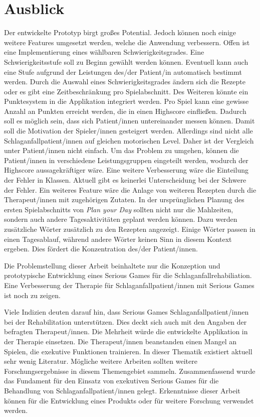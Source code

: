 \section{Ausblick}
Der entwickelte Prototyp birgt großes Potential. Jedoch können noch einige weitere Features umgesetzt werden, welche die Anwendung verbessern. Offen ist eine Implementierung eines wählbaren Schwierigkeitsgrades. Eine Schwierigkeitsstufe soll zu Beginn gewählt werden können. Eventuell kann auch eine Stufe aufgrund der Leistungen des/der Patient/in automatisch bestimmt werden. Durch die Auswahl eines Schwierigkeitsgrades ändern sich die Rezepte oder es gibt eine Zeitbeschränkung pro Spielabschnitt. Des Weiteren könnte ein Punktesystem in die Applikation integriert werden. Pro Spiel kann eine gewisse Anzahl an Punkten erreicht werden, die in einen Highscore einfließen. Dadurch soll es möglich sein, dass sich Patient/innen untereinander messen können. Damit soll die Motivation der Spieler/innen gesteigert werden. Allerdings sind nicht alle Schlaganfallpatient/innen auf gleichen motorischen Level. Daher ist der Vergleich unter Patient/innen nicht einfach. 
Um das Problem zu umgehen, können die Patient/innen in verschiedene Leistungsgruppen eingeteilt werden, wodurch der Highscore aussagekräftiger wäre. Eine weitere Verbesserung wäre die Einteilung der Fehler in Klassen. Aktuell gibt es keinerlei Unterscheidung bei der Schwere der Fehler. Ein weiteres Feature wäre die Anlage von weiteren Rezepten durch die Therapeut/innen mit zugehörigen Zutaten. In der ursprünglichen Planung des ersten Spielabschnitts von \textit{Plan your Day} sollten nicht nur die Mahlzeiten, sondern auch andere Tagesaktivitäten geplant werden können. Dazu werden zusätzliche Wörter zusätzlich zu den Rezepten angezeigt. Einige Wörter passen in einen Tagesablauf, während andere Wörter keinen Sinn in diesem Kontext ergeben. Dies fördert die Konzentration des/der Patient/innen.

Die Problemstellung dieser Arbeit beinhaltete nur die Konzeption und prototypische Entwicklung eines Serious Games für die Schlaganfallrehabiliation. Eine Verbesserung der Therapie für Schlaganfallpatient/innen mit Serious Games ist noch zu zeigen.

Viele Indizien deuten darauf hin, dass Serious Games Schlaganfallpatient/innen bei der Rehabilitation unterstützen. Dies deckt sich auch mit den Angaben der befragten Therapeut/innen. Die Mehrheit würde die entwickelte Applikation in der Therapie einsetzen. Die Therapeut/innen beanstanden einen Mangel an Spielen, die exekutive Funktionen trainieren. In dieser Thematik existiert aktuell sehr wenig Literatur. Mögliche weitere Arbeiten sollten weitere Forschungsergebnisse in diesem Themengebiet sammeln. Zusammenfassend wurde das Fundament für den Einsatz von exekutiven Serious Games für die Behandlung von Schlaganfallpatient/innen gelegt. Erkenntnisse dieser Arbeit können für die Entwicklung eines Produkts oder für weitere Forschung verwendet werden.